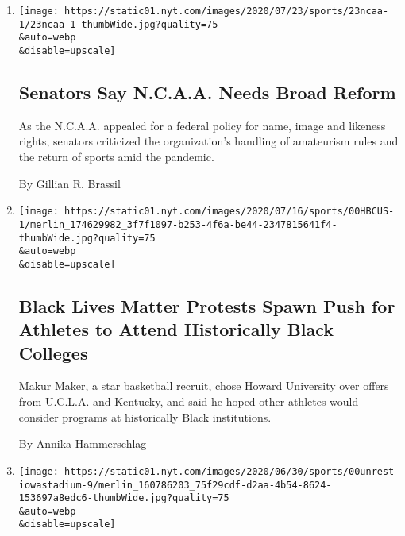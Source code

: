 \begin{enumerate}
\def\labelenumi{\arabic{enumi}.}
\item
  \href{/2020/07/23/sports/ncaa-NIL-rights.html}{}

  \texttt{[image: https://static01.nyt.com/images/2020/07/23/sports/23ncaa-1/23ncaa-1-thumbWide.jpg?quality=75\\\&auto=webp\\\&disable=upscale]}

  \hypertarget{senators-say-ncaa-needs-broad-reform}{%
  \subsection{Senators Say N.C.A.A. Needs Broad
  Reform}\label{senators-say-ncaa-needs-broad-reform}}

  As the N.C.A.A. appealed for a federal policy for name, image and
  likeness rights, senators criticized the organization's handling of
  amateurism rules and the return of sports amid the pandemic.

  By Gillian R. Brassil
\item
  \href{/2020/07/22/sports/ncaabasketball/black-lives-matter-hbcus-college-athletes.html}{}

  \texttt{[image: https://static01.nyt.com/images/2020/07/16/sports/00HBCUS-1/merlin\_174629982\_3f7f1097-b253-4f6a-be44-2347815641f4-thumbWide.jpg?quality=75\\\&auto=webp\\\&disable=upscale]}

  \hypertarget{black-lives-matter-protests-spawn-push-for-athletes-to-attend-historically-black-colleges}{%
  \subsection{Black Lives Matter Protests Spawn Push for Athletes to
  Attend Historically Black
  Colleges}\label{black-lives-matter-protests-spawn-push-for-athletes-to-attend-historically-black-colleges}}

  Makur Maker, a star basketball recruit, chose Howard University over
  offers from U.C.L.A. and Kentucky, and said he hoped other athletes
  would consider programs at historically Black institutions.

  By Annika Hammerschlag
\item
  \href{/2020/07/20/sports/ncaafootball/Iowa-State-Jack-Trice-Stadium.html}{}

  \texttt{[image: https://static01.nyt.com/images/2020/06/30/sports/00unrest-iowastadium-9/merlin\_160786203\_75f29cdf-d2aa-4b54-8624-153697a8edc6-thumbWide.jpg?quality=75\\\&auto=webp\\\&disable=upscale]}


\end{enumerate}
